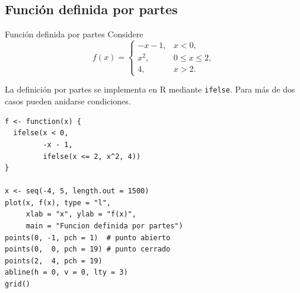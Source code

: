 \documentclass[aspectratio=169,10pt]{beamer}
\begin{document}
\subsection*{Función definida por partes}
\begin{frame}{Función definida por partes}
Considere
\[
f(x)=
\begin{cases}
-x-1,&x<0,\\
x^2,&0\leq x\leq2,\\
4,&x>2.
\end{cases}
\]

La definición por partes se implementa en R mediante \texttt{ifelse}. Para más
de dos casos pueden anidarse condiciones.

\begin{center}
\end{center}

\begin{verbatim}
f <- function(x) {
  ifelse(x < 0,
         -x - 1,
         ifelse(x <= 2, x^2, 4))
}

x <- seq(-4, 5, length.out = 1500)
plot(x, f(x), type = "l",
     xlab = "x", ylab = "f(x)",
     main = "Funcion definida por partes")
points(0, -1, pch = 1)  # punto abierto
points(0,  0, pch = 19) # punto cerrado
points(2,  4, pch = 19)
abline(h = 0, v = 0, lty = 3)
grid()
\end{verbatim}

\end{frame}
\end{document}
